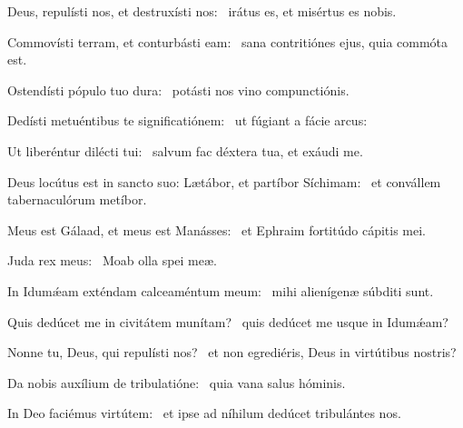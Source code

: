 \item Deus, repulísti nos, et destruxísti nos:~\psstar{} irátus es, et misértus es nobis.

\item Commovísti terram, et conturbásti eam:~\psstar{} sana contritiónes ejus, quia commóta est.

\item Ostendísti pópulo tuo dura:~\psstar{} potásti nos vino compunctiónis.

\item Dedísti metuéntibus te significatiónem:~\psstar{} ut fúgiant a fácie arcus:

\item Ut liberéntur dilécti tui:~\psstar{} salvum fac déxtera tua, et exáudi me.

\item Deus locútus est in sancto suo: Lætábor, et partíbor Síchimam:~\psstar{} et convállem tabernaculórum metíbor.

\item Meus est Gálaad, et meus est Manásses:~\psstar{} et Ephraim fortitúdo cápitis mei.

\item Juda rex meus:~\psstar{} Moab olla spei meæ.

\item In Idumǽam exténdam calceaméntum meum:~\psstar{} mihi alienígenæ súbditi sunt.

\item Quis dedúcet me in civitátem munítam?~\psstar{} quis dedúcet me usque in Idumǽam?

\item Nonne tu, Deus, qui repulísti nos?~\psstar{} et non egrediéris, Deus in virtútibus nostris?

\item Da nobis auxílium de tribulatióne:~\psstar{} quia vana salus hóminis.

\item In Deo faciémus virtútem:~\psstar{} et ipse ad níhilum dedúcet tribulántes nos.
